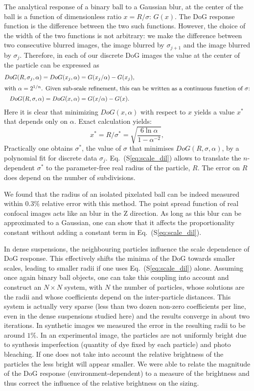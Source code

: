 \documentclass[reprint,notitlepage]{revtex4-1}
\begin{document}
The analytical response of a binary ball to a Gaussian blur, at the center of the ball is a function of dimensionless ratio $x=R/\sigma$: $G(x)$. The DoG response function is the difference between the two such functions. However, the choice of the width of the two functions is not arbitrary: we make the difference between two consecutive blurred images, the image blurred by $\sigma_{j+1}$ and the image blurred by $\sigma_j$. Therefore, in each of our discrete DoG images the value at the center of the particle can be expressed as
\begin{align}
DoG(R,\sigma_j, \alpha) = DoG(x_j, \alpha) &= G(x_j/\alpha) - G(x_j),\\
\intertext{with $\alpha=2^{1/n}$. Given sub-scale refinement, this can be written as a continuous function of $\sigma$:}
DoG(R,\sigma, \alpha) = DoG(x, \alpha) &= G(x/\alpha) - G(x).
\end{align}
Here it is clear that minimizing $DoG(x, \alpha)$ with respect to $x$ yields a value $x^*$ that depends only on $\alpha$. Exact calculation yields:
\begin{equation}
	x^* = R/\sigma^* = \sqrt{\frac{6\ln \alpha}{1-\alpha^{-2}}}, 
	\label{eq:scale_dil}
\end{equation}
Practically one obtains $\sigma^*$, the value of $\sigma$ that minimises $DoG(R,\sigma, \alpha)$, by a polynomial fit for discrete data $\sigma_j$. Eq.~(S\ref{eq:scale_dil}) allows to translate the $n$-dependent $\sigma^*$ to the parameter-free real radius of the particle, $R$. The error on $R$ does depend on the number of subdivisions.

We found that the radius of an isolated pixelated ball can be indeed measured within $0.3\%$ relative error with this method. The point spread function of real confocal images acts like an blur in the Z direction. As long as this blur can be approximated to a Gaussian, one can show that it affects the proportionality constant without adding a constant term in Eq.~(S\ref{eq:scale_dil}).

In dense suspensions, the neighbouring particles influence the scale dependence of DoG response. This effectively shifts the minima of the DoG towards smaller scales, leading to smaller radii if one uses Eq.~(S\ref{eq:scale_dil}) alone. Assuming once again binary ball objects, one can take this coupling into account and construct an $N\times N$ system, with $N$ the number of particles, whose solutions are the radii and whose coefficients depend on the inter-particle distances. This system is actually very sparse (less than two dozen non-zero coefficients per line, even in the dense suspensions studied here) and the results converge in about two iterations. In synthetic images we measured the error in the resulting radii to be around $1\%$. In an experimental image, the particles are not uniformly bright due to synthesis imperfection (quantity of dye fixed by each particle) and photo bleaching. If one does not take into account the relative brightness of the particles the less bright will appear smaller. We were able to relate the magnitude of the DoG response (environment-dependent) to a measure of the brightness and thus correct the influence of the relative brightness on the sizing.
\end{document}
